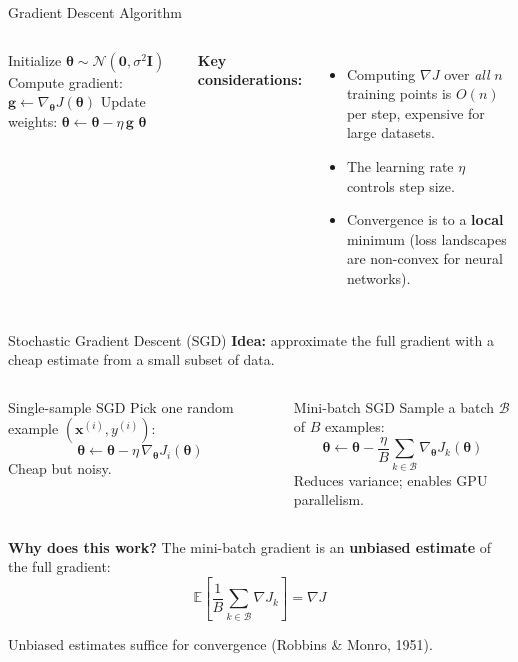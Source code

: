 \documentclass[aspectratio=169,11pt]{beamer}
\newcommand{\x}{\bm{x}}
\newcommand{\E}[1]{\mathbb{E}\!\left[#1\right]}
\begin{document}
\begin{frame}{Gradient Descent Algorithm}
\begin{columns}[T]
\begin{algorithm}[H]
\caption*{\textbf{Gradient Descent}}
\begin{algorithmic}[1]
\STATE Initialize $\bm{\theta} \sim \mathcal{N}(\bm{0}, \sigma^2\bm{I})$
\REPEAT
    \STATE Compute gradient: $\bm{g} \leftarrow \nabla_{\!\bm{\theta}} J(\bm{\theta})$
    \STATE Update weights: $\bm{\theta} \leftarrow \bm{\theta} - \eta\,\bm{g}$
\RETURN $\bm{\theta}$
\end{algorithmic}
\end{algorithm}

\textbf{Key considerations:}
\begin{itemize}
    \item Computing $\nabla J$ over \emph{all} $n$ training points is $O(n)$ per step, expensive for large datasets.
    \item The learning rate $\eta$ controls step size.
    \item Convergence is to a \textbf{local} minimum (loss landscapes are non-convex for neural networks).
\end{itemize}
\end{columns}
\end{frame}

\begin{frame}[shrink=8]{Stochastic Gradient Descent (SGD)}
\textbf{Idea:} approximate the full gradient with a cheap estimate from a small subset of data.

\vspace{0.3cm}
\begin{columns}[T]
\begin{block}{Single-sample SGD}
Pick one random example $(\x^{(i)},y^{(i)})$:
\[
    \bm{\theta} \leftarrow \bm{\theta} - \eta\,\nabla_{\!\bm{\theta}} J_i(\bm{\theta})
\]
Cheap but noisy.
\end{block}

\begin{block}{Mini-batch SGD}
Sample a batch $\mathcal{B}$ of $B$ examples:
\[
    \bm{\theta} \leftarrow \bm{\theta} - \frac{\eta}{B}\sum_{k\in\mathcal{B}} \nabla_{\!\bm{\theta}} J_k(\bm{\theta})
\]
Reduces variance; enables GPU parallelism.
\end{block}
\end{columns}

\vspace{0.15cm}
{\small\textbf{Why does this work?} The mini-batch gradient is an \textbf{unbiased estimate} of the full gradient:}
\vspace{-0.15cm}
\[
    \E{\frac{1}{B}\sum_{k\in\mathcal{B}}\nabla J_k} = \nabla J
\]
\vspace{-0.4cm}

{\small Unbiased estimates suffice for convergence (Robbins \& Monro, 1951).}
\end{frame}
\end{document}
